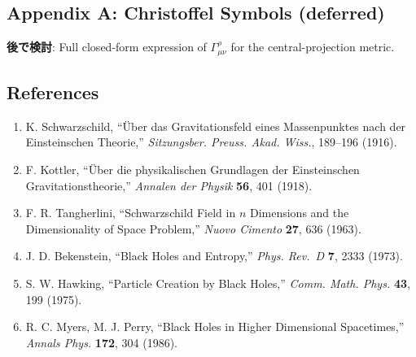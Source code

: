 \documentclass[a4paper,11pt]{article}
\theoremstyle{definition}
\providecommand{\tightlist}{\setlength{\itemsep}{0pt}\setlength{\parskip}{0pt}}
\begin{document}
\subsection{Appendix A: Christoffel Symbols
(deferred)}\label{appendix-a-christoffel-symbols-deferred}

\textbf{後で検討}: Full closed-form expression of
\(\Gamma^\rho_{\mu\nu}\) for the central-projection metric.

\subsection{References}\label{references}

\begin{enumerate}
\def\labelenumi{\arabic{enumi}.}
\tightlist
\item
  K. Schwarzschild, ``Über das Gravitationsfeld eines Massenpunktes nach
  der Einsteinschen Theorie,'' \emph{Sitzungsber. Preuss. Akad. Wiss.},
  189--196 (1916).
\item
  F. Kottler, ``Über die physikalischen Grundlagen der Einsteinschen
  Gravitationstheorie,'' \emph{Annalen der Physik} \textbf{56}, 401
  (1918).
\item
  F. R. Tangherlini, ``Schwarzschild Field in \(n\) Dimensions and the
  Dimensionality of Space Problem,'' \emph{Nuovo Cimento} \textbf{27},
  636 (1963).
\item
  J. D. Bekenstein, ``Black Holes and Entropy,'' \emph{Phys. Rev.~D}
  \textbf{7}, 2333 (1973).
\item
  S. W. Hawking, ``Particle Creation by Black Holes,'' \emph{Comm. Math.
  Phys.} \textbf{43}, 199 (1975).
\item
  R. C. Myers, M. J. Perry, ``Black Holes in Higher Dimensional
  Spacetimes,'' \emph{Annals Phys.} \textbf{172}, 304 (1986).
\end{enumerate}
\end{document}
